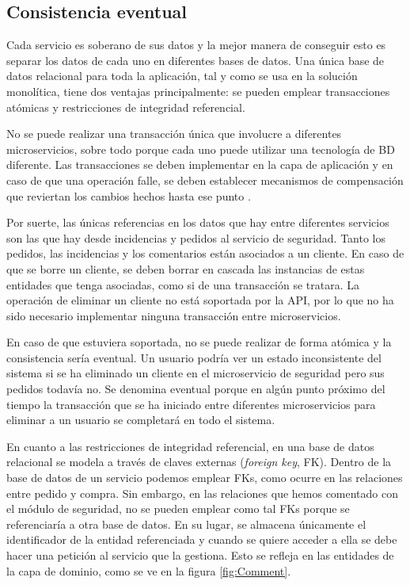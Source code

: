 \documentclass[11pt,spanish,listoffigures]{tfgetsinf}
\begin{document}
\subsection{Consistencia eventual}

Cada servicio es soberano de sus datos y la mejor manera de conseguir esto es separar los datos de cada uno en diferentes bases de datos. Una única base de datos relacional para toda la aplicación, tal y como se usa en la solución monolítica, tiene dos ventajas principalmente: se pueden emplear transacciones atómicas y restricciones de integridad referencial. 

No se puede realizar una transacción única que involucre a diferentes microservicios, sobre todo porque cada uno puede utilizar una tecnología de BD diferente. Las transacciones se deben implementar en la capa de aplicación y en caso de que una operación falle, se deben establecer mecanismos de compensación que reviertan los cambios hechos hasta ese punto \cite{DelaTorre2018}.

Por suerte, las únicas referencias en los datos que hay entre diferentes servicios son las que hay desde incidencias y pedidos al servicio de seguridad. Tanto los pedidos, las incidencias y los comentarios están asociados a un cliente. En caso de que se borre un cliente, se deben borrar en cascada las instancias de estas entidades que tenga asociadas, como si de una transacción se tratara. La operación de eliminar un cliente no está soportada por la API, por lo que no ha sido necesario implementar ninguna transacción entre microservicios.

En caso de que estuviera soportada, no se puede realizar de forma atómica y la consistencia sería eventual. Un usuario podría ver un estado inconsistente del sistema si se ha eliminado un cliente en el microservicio de seguridad pero sus pedidos todavía no. Se denomina eventual porque en algún punto próximo del tiempo la transacción que se ha iniciado entre diferentes microservicios para eliminar a un usuario se completará en todo el sistema.

En cuanto a las restricciones de integridad referencial, en una base de datos relacional se modela a través de claves externas (\textit{foreign key}, FK). Dentro de la base de datos de un servicio podemos emplear FKs, como ocurre en las relaciones entre pedido y compra. Sin embargo, en las relaciones que hemos comentado con el módulo de seguridad, no se pueden emplear como tal FKs porque se referenciaría a otra base de datos. En su lugar, se almacena únicamente el identificador de la entidad referenciada y cuando se quiere acceder a ella se debe hacer una petición al servicio que la gestiona. Esto se refleja en las entidades de la capa de dominio, como se ve en la figura \ref{fig:Comment}.
\end{document}
